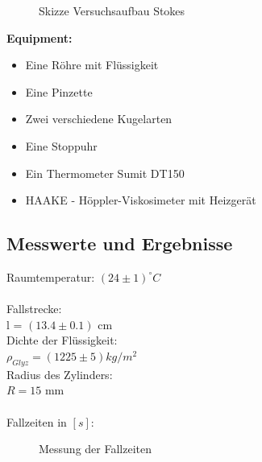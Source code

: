 \documentclass[12pt,a4paper]{article}
\begin{document}
\begin{multicols}{2}
\begin{figure}[H]
	\caption{Skizze Versuchsaufbau Stokes}
	\label{fig:visko_aufbau}
\end{figure}

\textbf{Equipment:}\\
\begin{itemize}
	\item Eine Röhre mit Flüssigkeit
	\item Eine Pinzette
	\item Zwei verschiedene Kugelarten
	\item Eine Stoppuhr
	\item Ein Thermometer Sumit DT150
	\item HAAKE - Höppler-Viskosimeter mit Heizgerät
\end{itemize}

\subsection{Messwerte und Ergebnisse}
Raumtemperatur: $(24 \pm 1)^{\circ}C$\\
\\
Fallstrecke: \\
\indent l = $(13.4 \pm 0.1)$ cm\\
\noindent Dichte der Flüssigkeit: \\
\indent $\rho_{Glyz} = (1225 \pm 5) kg/m^2$\\
Radius des Zylinders:\\
\indent$R=15$ mm\\
\\
Fallzeiten in $[s]$:
\begin{figure}[H]
	\centering
	\caption{Messung der Fallzeiten}
	\label{fig:visko_fallzeit}
\end{figure}
\noindent


\end{multicols}
\end{document}
